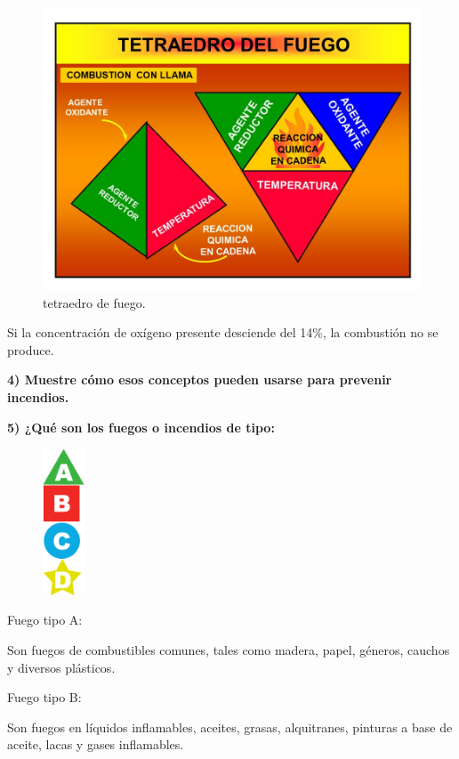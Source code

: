 \documentclass[letterpaper,11pt]{article}
\begin{document}
\begin{figure}[H]
\centering
\includegraphics[scale=0.4]{TETRAEDRO+DEL+FUEGO+AGENTE+REDUCTOR+OXIDANTE+TEMPERATURA.jpg} 
\caption{tetraedro de fuego.}
\label{fig:fig2}
\end{figure}

Si la concentración de oxígeno presente desciende del 14\%, la combustión no se produce.


\textbf{4) Muestre cómo esos conceptos pueden usarse para prevenir incendios.}

\textbf{5) ¿Qué son los fuegos o incendios de tipo:}

\begin{figure}
    \centering
    \includegraphics[width=0.111\textwidth]{ABCD.png}
\end{figure}

Fuego tipo A:

Son fuegos de combustibles comunes, tales como madera, papel, géneros, cauchos y diversos plásticos.


Fuego tipo B:

Son fuegos en líquidos inflamables, aceites, grasas, alquitranes, pinturas a base de aceite, lacas y gases inflamables.
\end{document}
